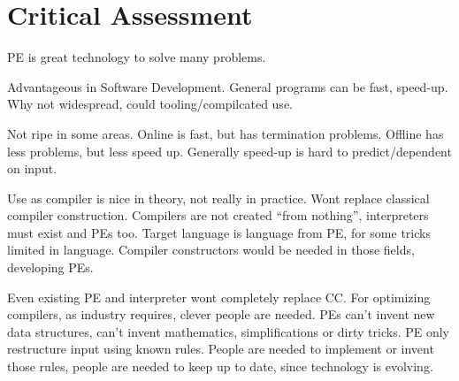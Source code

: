 
\section{Critical Assessment}\label{sec:discussion}

PE is great technology to solve many problems.

Advantageous in Software Development.
General programs can be fast, speed-up.
Why not widespread, could tooling/compilcated use.


Not ripe in some areas.
Online is fast, but has termination problems.
Offline has less problems, but less speed up.
Generally speed-up is hard to predict/dependent on input.


Use as compiler is nice in theory, not really in practice.
Wont replace classical compiler construction.
Compilers are not created ``from nothing'', interpreters must exist and PEs too.
Target language is language from PE, for some tricks limited in language.
Compiler constructors would be needed in those fields, developing PEs.

Even existing PE and interpreter wont completely replace CC.
For optimizing compilers, as industry requires, clever people are needed.
PEs can't invent new data structures, can't invent mathematics, simplifications or dirty tricks.
PE only restructure input using known rules.
People are needed to implement or invent those rules,
people are needed to keep up to date, since technology is evolving.



